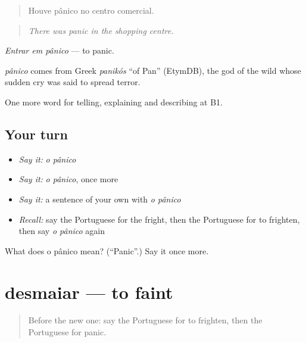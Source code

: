 \begin{quote}
Houve pânico no centro comercial.
\end{quote}

\begin{quote}
\emph{There was panic in the shopping centre.}
\end{quote}

\emph{Entrar em pânico} — to panic.

\begin{cousinweb}
\emph{pânico} comes from Greek \emph{panikós} \textquotedblleft{}of Pan\textquotedblright{} (EtymDB), the god of the wild whose sudden cry was said to spread terror.
\end{cousinweb}

\begin{grammarlens}[title={What you've built}]
One more word for telling, explaining and describing at B1.
\end{grammarlens}

\subsection*{Your turn}
\begin{itemize}
\raggedright
  \item \emph{Say it:} \emph{o pânico}
  \item \emph{Say it:} \emph{o pânico}, once more
  \item \emph{Say it:} a sentence of your own with \emph{o pânico}
  \item \emph{Recall:} say the Portuguese for the fright, then the Portuguese for to frighten, then say \emph{o pânico} again
\end{itemize}

\begin{tcolorbox}[breakable,colback=teal!4,colframe=teal!35!black,title={Before you move on}]
What does o pânico mean? (\textquotedblleft{}Panic\textquotedblright{}.) Say it once more.
\end{tcolorbox}
\section[desmaiar]{desmaiar — to faint}

\label{lesson:PT-C308-desmaiar}



\begin{quote}
Before the new one: say the Portuguese for to frighten, then the Portuguese for panic.
\end{quote}

